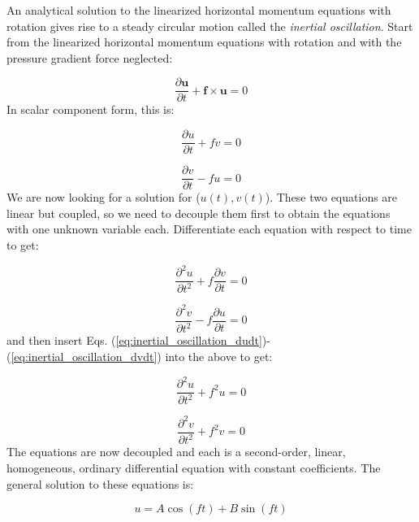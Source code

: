 \documentclass[12pt]{article}
\numberwithin{equation}{section}
\numberwithin{figure}{section}
\numberwithin{table}{section}
\begin{document}
An analytical solution to the linearized horizontal momentum equations with
rotation gives rise to a steady circular motion called the \textit{inertial
oscillation}.
Start from the linearized horizontal momentum equations with rotation
and with the pressure gradient force neglected:

\begin{equation}
  \frac{\partial \mathbf{u}}{\partial t} + \mathbf{f} \times \mathbf{u} = 0
\end{equation}
In scalar component form, this is:

\begin{equation}
  \frac{\partial u}{\partial t} + f v = 0
  \label{eq:inertial_oscillation_dudt}
\end{equation}

\begin{equation}
  \frac{\partial v}{\partial t} - f u = 0
  \label{eq:inertial_oscillation_dvdt}
\end{equation}
We are now looking for a solution for ($u(t), v(t)$).
These two equations are linear but coupled, so we need to decouple them
first to obtain the equations with one unknown variable each.
Differentiate each equation with respect to time to get:

\begin{equation}
  \frac{\partial^2 u}{\partial t^2} + f \frac{\partial v}{\partial t} = 0
\end{equation}

\begin{equation}
  \frac{\partial^2 v}{\partial t^2} - f \frac{\partial u}{\partial t} = 0
\end{equation}
and then insert Eqs. (\ref{eq:inertial_oscillation_dudt})-(\ref{eq:inertial_oscillation_dvdt})
into the above to get:

\begin{equation}
  \frac{\partial^2 u}{\partial t^2} + f^2 u = 0
\end{equation}

\begin{equation}
  \frac{\partial^2 v}{\partial t^2} + f^2 v = 0
\end{equation}
The equations are now decoupled and each is a second-order, linear, homogeneous,
ordinary differential equation with constant coefficients.
The general solution to these equations is:

\begin{equation}
  u = A \cos(f t) + B \sin(f t)
\end{equation}
\end{document}
